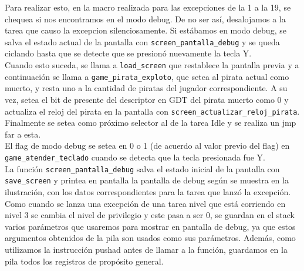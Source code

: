 Para realizar esto, en la macro realizada para las excepciones de la 1 a la 19, se chequea si nos encontramos en el modo debug. De no ser así, desalojamos a la tarea que causo la excepcion silenciosamente. Si estábamos en modo debug, se salva el estado actual de la pantalla con \texttt{screen\_pantalla\_debug} y se queda ciclando hasta que se detecte que se presionó nuevamente la tecla Y.\\

Cuando esto suceda, se llama a \texttt{load\_screen} que restablece la pantalla previa y a continuación se llama a \texttt{game\_pirata\_exploto}, que setea al pirata actual como muerto, y resta uno a la cantidad de piratas del jugador correspondiente. A su vez, setea el bit de presente del descriptor en GDT del pirata muerto como 0 y actualiza el reloj del pirata en la pantalla con \texttt{screen\_actualizar\_reloj\_pirata}.\\ 

Finalmente se setea como próximo selector al de la tarea Idle y se realiza un jmp far a esta.\\

El flag de modo debug se setea en 0 o 1 (de acuerdo al valor previo del flag) en \texttt{game\_atender\_teclado} cuando se detecta que la tecla presionada fue Y.\\

La función \texttt{screen\_pantalla\_debug} salva el estado inicial de la pantalla con \texttt{save\_screen} y printea en pantalla la pantalla de debug según se muestra en la ilustración, con los datos correspondientes para la tarea que lanzó la excepción.\\

Como cuando se lanza una excepción de una tarea nivel que está corriendo en nivel 3 se cambia el nivel de privilegio y este pasa a ser 0, se guardan en el stack varios parámetros que usaremos para mostrar en pantalla de debug, ya que estos argumentos obtenidos de la pila son usados como sus parámetros. Además, como utilizamos la instrucción pushad antes de llamar a la función, guardamos en la pila todos los registros de propósito general. 


